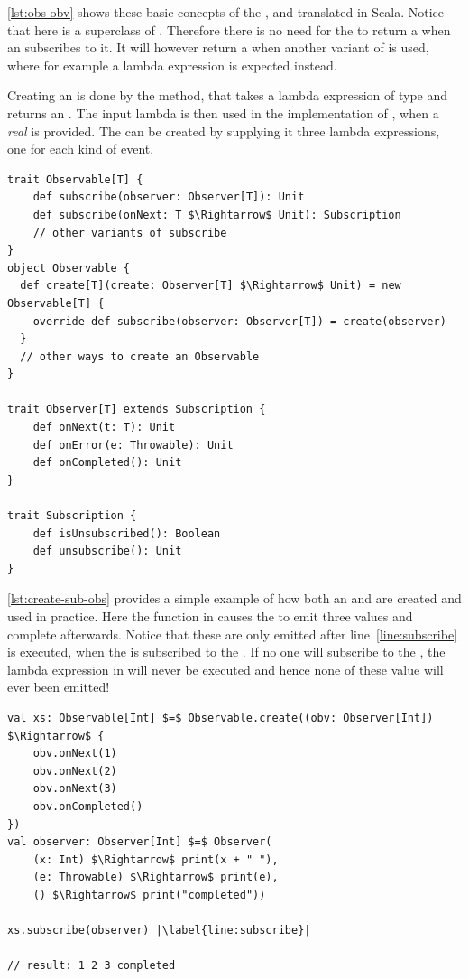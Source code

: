 \autoref{lst:obs-obv} shows these basic concepts of the \obs, \obv and \subs translated in Scala. Notice that here \subs is a superclass of \obv. Therefore there is no need for the \obs to return a \subs when an \obv subscribes to it. It will however return a \subs when another variant of  is used, where for example a lambda expression is expected instead.

Creating an \obs is done by the  method, that takes a lambda expression of type  and returns an \obs. The input lambda is then used in the implementation of , when a \emph{real} \obv is provided. The \obv can be created by supplying it three lambda expressions, one for each kind of event.

\begin{minipage}{\linewidth}
\begin{lstlisting}[style=ScalaStyle, caption={Observable, Observer and Subscription}, label={lst:obs-obv}]
trait Observable[T] {
    def subscribe(observer: Observer[T]): Unit
    def subscribe(onNext: T $\Rightarrow$ Unit): Subscription
    // other variants of subscribe
}
object Observable {
  def create[T](create: Observer[T] $\Rightarrow$ Unit) = new Observable[T] {
    override def subscribe(observer: Observer[T]) = create(observer)
  }
  // other ways to create an Observable
}

trait Observer[T] extends Subscription {
    def onNext(t: T): Unit
    def onError(e: Throwable): Unit
    def onCompleted(): Unit
}

trait Subscription {
    def isUnsubscribed(): Boolean
    def unsubscribe(): Unit
}
\end{lstlisting}
\end{minipage}

\autoref{lst:create-sub-obs} provides a simple example of how both an \obs and \obv are created and used in practice. Here the function in  causes the \obs to emit three values and complete afterwards. Notice that these are only emitted after line~\ref{line:subscribe} is executed, when the \obv is subscribed to the \obs. If no one will subscribe to the \obs, the lambda expression in  will never be executed and hence none of these value will ever been emitted!

\begin{minipage}{\linewidth}
\begin{lstlisting}[style=ScalaStyle, caption={Creating and subscribing to an \obs}, label={lst:create-sub-obs}]
val xs: Observable[Int] $=$ Observable.create((obv: Observer[Int]) $\Rightarrow$ {
    obv.onNext(1)
    obv.onNext(2)
    obv.onNext(3)
    obv.onCompleted()
})
val observer: Observer[Int] $=$ Observer(
    (x: Int) $\Rightarrow$ print(x + " "),
    (e: Throwable) $\Rightarrow$ print(e),
    () $\Rightarrow$ print("completed"))

xs.subscribe(observer) |\label{line:subscribe}|

// result: 1 2 3 completed
\end{lstlisting}
\end{minipage}

